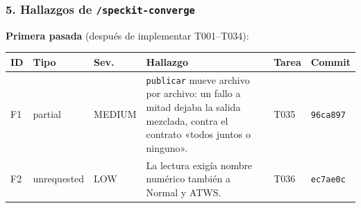 \documentclass[12pt,a4paper]{article}
\newcounter{none} %
\newenvironment{documentogenerado}[2]{%
  \def\doccomando{#1}\def\docruta{#2}%
  \par\begingroup\small\setstretch{1.15}\sloppy%
}{\endgroup\par\medskip}
\begin{document}
\begin{documentogenerado}{/speckit-analyze + /speckit-converge}{specs\slash 001-preparacion-datos\slash auditoria.md}
\subsubsection{\texorpdfstring{5. Hallazgos de \texttt{/\allowbreak{}speckit-\allowbreak{}converge}}{5. Hallazgos de /speckit-converge}}

\textbf{Primera pasada} (después de implementar T001--T034):

{\def\LTcaptype{none} %
{\footnotesize
\begin{longtable}[]{@{}
  >{\raggedright\arraybackslash\hspace{0pt}}p{}
  >{\raggedright\arraybackslash\hspace{0pt}}p{}
  >{\raggedright\arraybackslash\hspace{0pt}}p{}
  >{\raggedright\arraybackslash\hspace{0pt}}p{}
  >{\raggedright\arraybackslash\hspace{0pt}}p{}
  >{\raggedright\arraybackslash\hspace{0pt}}p{}@{}}
\toprule\noalign{}
\begin{minipage}[b]{\linewidth}\raggedright
ID
\end{minipage} & \begin{minipage}[b]{\linewidth}\raggedright
Tipo
\end{minipage} & \begin{minipage}[b]{\linewidth}\raggedright
Sev.
\end{minipage} & \begin{minipage}[b]{\linewidth}\raggedright
Hallazgo
\end{minipage} & \begin{minipage}[b]{\linewidth}\raggedright
Tarea
\end{minipage} & \begin{minipage}[b]{\linewidth}\raggedright
Commit
\end{minipage} \\
\midrule\noalign{}
\endhead
\bottomrule\noalign{}
\endlastfoot
F1 & partial & MEDIUM & \texttt{publicar} mueve archivo por archivo: un fallo a mitad dejaba la salida mezclada, contra el contrato «todos juntos o ninguno». & T035 & \texttt{96ca897} \\
F2 & unrequested & LOW & La lectura exigía nombre numérico también a Normal y ATWS. & T036 & \texttt{ec7ae0c} \\

\end{longtable}}}
\end{documentogenerado}
\end{document}
